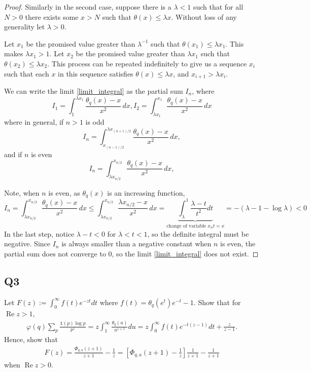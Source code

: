 \documentclass{article}
\theoremstyle{definition}
\theoremstyle{definition}
\theoremstyle{remark}
\begin{document}
\begin{proof}

	Similarly in the second case, suppose there is a $\lambda < 1$ such that for all $N > 0$ there exists some $x > N$ such that $\theta(x) \leq \lambda x$. 
	Without loss of any generality let $\lambda > 0$.

	Let $x_1$ be the promised value greater than $\lambda^{-1}$ such that
	$\theta(x_1) \leq \lambda x_1$.
	This makes $\lambda x_1 > 1$.
	Let $x_2$ be the promised value greater than $\lambda x_1$ such that $\theta(x_2) \leq \lambda x_2$. 
	This process can be repeated indefinitely to give us a sequence $x_i$ such that each $x$ in this sequence satisfies $\theta(x) \leq \lambda x$, and $x_{i+1} > \lambda x_i$.

	We can write the limit \eqref{limit_integral} as the partial sum $I_n$, where 
	$$
	I_1 = \int_1^{\lambda x_1} \frac{\theta_q(x) - x}{x^2} \,dx,
	I_2 = \int^{x_1}_{\lambda x_1} \frac{\theta_q(x) - x}{x^2} \,dx
	$$
	where in general, if $n > 1$ is odd
	$$
	I_n = \int^{\lambda x_{(n+1)/2}}_{x_{(n-1)/2}} \frac{\theta_q(x) - x}{x^2} \,dx,
	$$
	and if $n$ is even
	$$
	I_n = \int^{x_{n/2}}_{\lambda x_{n/2}} \frac{\theta_q(x) - x}{x^2} \,dx,
	$$

	Note, when $n$ is even, as $\theta_q (x)$ is an increasing function,
	$$
	I_n = \int^{x_{n/2}}_{\lambda x_{n/2}} \frac{\theta_q(x) - x}{x^2} \,dx
	\leq 
	\int^{x_{n/2}}_{\lambda x_{n/2}} \frac{\lambda x_{n/2} - x}{x^2} \,dx 
	=
	\underbrace{
		\int^{1}_{\lambda} \frac{\lambda -t}{t^2} dt
	}_{\text{change of variable } x_n t = x}
	= - (\lambda -1 - \log \lambda) < 0
	$$
	In the last step, notice $\lambda - t < 0 $ for $\lambda <t < 1 $, so the definite integral must be negative.
	Since $I_n$ is always smaller than a negative constant when $n$ is even, the partial sum does not converge to $0$, so the limit \eqref{limit_integral} does not exist.
\end{proof}

\subsection*{Q3}

Let $F(z) := \int_0^\infty f(t)e^{-zt}dt$ where $f(t) = \theta_q(e^t)e^{-t} - 1$. Show that for $\operatorname{Re} z > 1$,
\begin{align}
	\varphi(q) \sum_p \frac{\mathbb{1}(p) \log p}{p^z} = z \int_1^\infty \frac{\theta_q(u)}{u^{z+1}} du = z \int_0^\infty f(t)e^{-t(z-1)}dt + \frac{z}{z-1}.
\end{align}
Hence, show that
\begin{align}
F(z) = \frac{\Phi_{q,a}(z+1)}{z+1} - \frac{1}{z} = \left[ \Phi_{q,a}(z+1) - \frac{1}{z} \right] \frac{1}{z+1} - \frac{1}{z+1} 
\end{align} 
when $\operatorname{Re} z > 0$.
\end{document}
